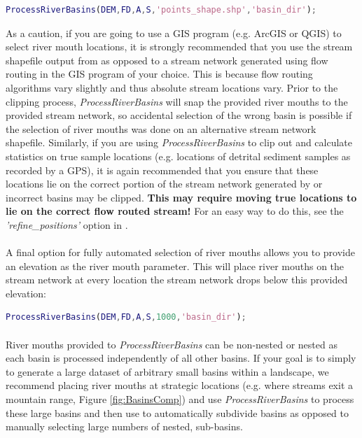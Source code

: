 \begin{lstlisting}[language=Matlab]
% Using a point shapefile to run ProcessRiverBasins
ProcessRiverBasins(DEM,FD,A,S,'points_shape.shp','basin_dir');
\end{lstlisting}

\noindent
As a caution, if you are going to use a GIS program (e.g. ArcGIS or QGIS) to select river mouth locations, it is strongly recommended that you use the stream shapefile output from  as opposed to a stream network generated using flow routing in the GIS program of your choice. This is because flow routing algorithms vary slightly and thus  absolute stream locations vary. Prior to the clipping process, \textit{ProcessRiverBasins} will snap the provided river mouths to the provided stream network, so accidental selection of the wrong basin is possible if the selection of river mouths was done on an alternative stream network shapefile. Similarly, if you are using \textit{ProcessRiverBasins} to clip out and calculate statistics on true sample locations (e.g. locations of detrital sediment samples as recorded by a GPS), it is again recommended that you ensure that these locations lie on the correct portion of the stream network generated by  or incorrect basins may be clipped. \textbf{This may require moving true locations to lie on the correct flow routed stream!} For an easy way to do this, see the \textit{'refine\_positions'} option in .

\paragraph{}A final option for fully automated selection of river mouths allows you to provide an elevation as the river mouth parameter. This will place river mouths on the stream network at every location the stream network drops below this provided elevation:

\begin{lstlisting}[language=Matlab]
% To create basins with outlets above 1000 meters elevation
ProcessRiverBasins(DEM,FD,A,S,1000,'basin_dir');
\end{lstlisting}

\paragraph{}River mouths provided to \textit{ProcessRiverBasins} can be non-nested or nested as each basin is processed independently of all other basins. If your goal is to simply to generate a large dataset of arbitrary small basins within a landscape, we recommend placing river mouths at strategic locations (e.g. where streams exit a mountain range, Figure \ref{fig:BasinsComp}) and use \textit{ProcessRiverBasins} to process these large basins and then use  to automatically subdivide basins as opposed to manually selecting large numbers of nested, sub-basins.

